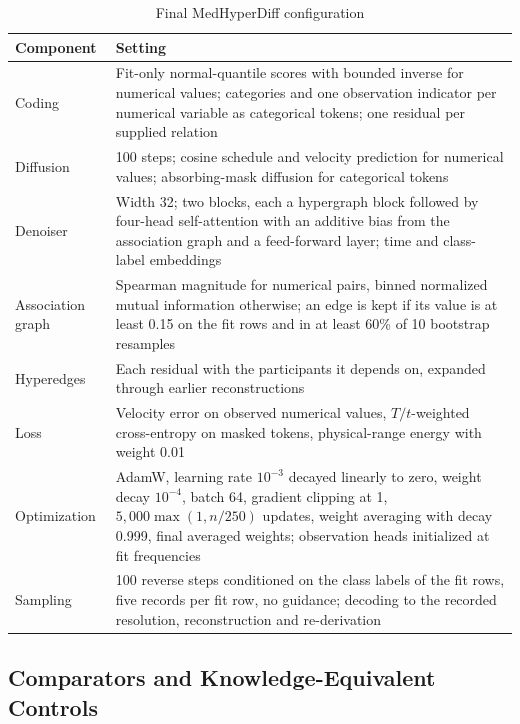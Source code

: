 \documentclass[conference]{IEEEtran}
\begin{document}
\begin{table}[t]
\caption{Final MedHyperDiff configuration}
\label{tab:config}
\centering
\setlength{\tabcolsep}{3pt}
\begin{tabular}{p{1.9cm}p{6.1cm}}
\toprule
Component & Setting \\
\midrule
Coding & Fit-only normal-quantile scores with bounded inverse for numerical values; categories and one observation indicator per numerical variable as categorical tokens; one residual per supplied relation \\
Diffusion & 100 steps; cosine schedule and velocity prediction for numerical values; absorbing-mask diffusion for categorical tokens \\
Denoiser & Width 32; two blocks, each a hypergraph block followed by four-head self-attention with an additive bias from the association graph and a feed-forward layer; time and class-label embeddings \\
Association graph & Spearman magnitude for numerical pairs, binned normalized mutual information otherwise; an edge is kept if its value is at least 0.15 on the fit rows and in at least 60\% of 10 bootstrap resamples \\
Hyperedges & Each residual with the participants it depends on, expanded through earlier reconstructions \\
Loss & Velocity error on observed numerical values, $T/t$-weighted cross-entropy on masked tokens, physical-range energy with weight 0.01 \\
Optimization & AdamW, learning rate $10^{-3}$ decayed linearly to zero, weight decay $10^{-4}$, batch 64, gradient clipping at 1, $5{,}000\max(1, n/250)$ updates, weight averaging with decay 0.999, final averaged weights; observation heads initialized at fit frequencies \\
Sampling & 100 reverse steps conditioned on the class labels of the fit rows, five records per fit row, no guidance; decoding to the recorded resolution, reconstruction and re-derivation \\
\bottomrule
\end{tabular}
\end{table}

\subsection{Comparators and Knowledge-Equivalent Controls}
\end{document}
